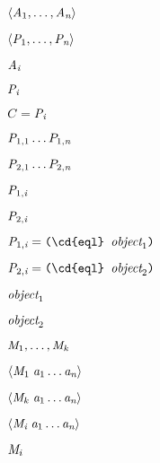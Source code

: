 {\newpage
\clearpage
\samepage $\langle {\it A}_ 1, \ldots, {\it A}_ {\hbox{\scriptsize\it n}}\rangle$
}

{\newpage
\clearpage
\samepage $\langle {\it P}_ 1,
\ldots, {\it P}_ {\hbox{\scriptsize\it n}}\rangle$
}

{\newpage
\clearpage
\samepage ${\it A}_ {\hbox{\scriptsize\it i}}$
}

{\newpage
\clearpage
\samepage ${\it P}_ {\hbox{\scriptsize\it i}}$
}

{\newpage
\clearpage
\samepage $C={\it P}_ {\hbox{\scriptsize\it i}}$
}

{\newpage
\clearpage
\samepage ${\it P}_{1,1}\ldots P_{1,\hbox{\scriptsize\it n}}$
}

{\newpage
\clearpage
\samepage ${\it P}_{2,1}\ldots P_{2,\hbox{\scriptsize\it n}}$
}

{\newpage
\clearpage
\samepage ${\it P}_{1,\hbox{\scriptsize\it i}}$
}

{\newpage
\clearpage
\samepage ${\it P}_{2,\hbox{\scriptsize\it i}}$
}

{\newpage
\clearpage
\samepage ${\it P}_{1,\hbox{\scriptsize\it i}}=\hbox{{\tt(\cd{eql} $\hbox{{\it object}}_ 1$)}}$
}

{\newpage
\clearpage
\samepage ${\it P}_{2,\hbox{\scriptsize\it i}}=\hbox{{\tt(\cd{eql} $\hbox{{\it object}}_ 2$)}}$
}

{\newpage
\clearpage
\samepage $\hbox{{\it object}}_ 1$
}

{\newpage
\clearpage
\samepage $\hbox{{\it object}}_ 2$
}

{\newpage
\clearpage
\samepage ${\it M}_ 1,\ldots,{\it M}_ {\hbox{\scriptsize\it k}}$
}

{\newpage
\clearpage
\samepage $\langle {\it M}_ 1\;{\it a}_ 1\ldots {\it a}_ {\hbox{\scriptsize\it n}}\rangle$
}

{\newpage
\clearpage
\samepage $\langle {\it M}_ k\;{\it a}_ 1\ldots {\it a}_ {\hbox{\scriptsize\it n}}\rangle$
}

{\newpage
\clearpage
\samepage $\langle {\it M}_ {\hbox{\scriptsize\it i}} \;{\it a}_ 1\ldots {\it a}_
{\hbox{\scriptsize\it n}}\rangle$
}

{\newpage
\clearpage
\samepage ${\it M}_ i$
}

